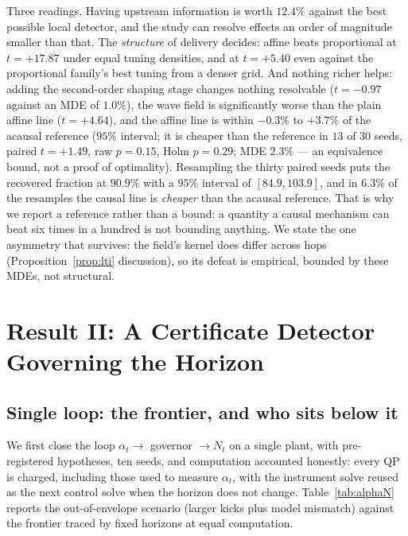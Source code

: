 \documentclass[journal]{IEEEtran}
\theoremstyle{definition}
\begin{document}
Three readings. Having upstream information is worth $12.4\%$ against the best
possible local detector, and the study can resolve effects an order of
magnitude smaller than that. The \emph{structure} of delivery decides:
affine beats proportional at $t=+17.87$ under equal tuning densities, and at
$t=+5.40$ even against the proportional family's best tuning from a denser
grid. And nothing richer helps: adding the second-order shaping stage changes
nothing resolvable ($t=-0.97$ against an MDE of $1.0\%$), the wave field is
significantly worse than the plain affine line ($t=+4.64$), and the affine line
is within $-0.3\%$ to $+3.7\%$ of the acausal reference ($95\%$
interval; it is cheaper than the reference in $13$ of
$30$ seeds, paired $t=+1.49$, raw $p=0.15$,
Holm $p=0.29$; MDE $2.3\%$ --- an equivalence bound, not a proof of
optimality). Resampling the thirty paired seeds puts
the recovered fraction at $90.9\%$ with a $95\%$ interval of
$[84.9,103.9]$, and in $6.3\%$ of the resamples the causal line is \emph{cheaper}
than the acausal reference. That is why we report a reference rather than a
bound: a quantity a causal mechanism can beat six times in a hundred is not
bounding anything. We state the one asymmetry that survives:
the field's kernel does differ across hops (Proposition~\ref{prop:lti}
discussion), so its defeat is empirical, bounded by these MDEs, not
structural.

\section{Result II: A Certificate Detector Governing the Horizon}
\label{sec:alphaN}
\subsection{Single loop: the frontier, and who sits below it}
We first close the loop $\alpha_t\rightarrow$ governor $\rightarrow N_t$ on a
single plant, with pre-registered hypotheses, ten seeds, and computation
accounted honestly: every QP is charged, including those used to measure
$\alpha_t$, with the instrument solve reused as the next control solve when the
horizon does not change. Table~\ref{tab:alphaN} reports the out-of-envelope
scenario (larger kicks plus model mismatch) against the frontier traced by
fixed horizons at equal computation.
\end{document}
